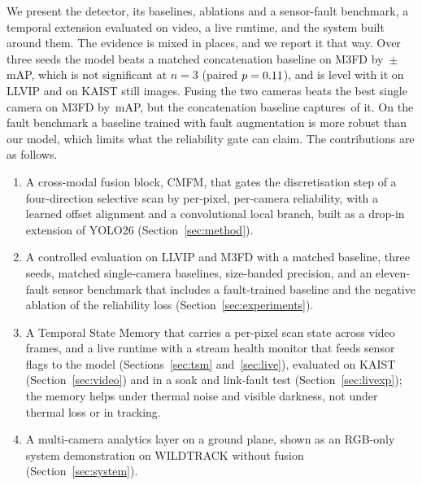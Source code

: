 We present the detector, its baselines, ablations and a sensor-fault benchmark, a temporal extension evaluated on video, a live runtime, and the system built around them. The evidence is mixed in places, and we report it that way. Over three seeds the model beats a matched concatenation baseline on M3FD by \marMfdVtwoVsConcatMdMeanMap{}\,$\pm$\,\marMfdVtwoVsConcatMdStdMap{} mAP, which is not significant at $n=3$ (paired $p=0.11{}$), and is level with it on LLVIP and on KAIST still images. Fusing the two cameras beats the best single camera on M3FD by \gainMfdCffmVtwoOverBestMeanMap{}\,mAP, but the concatenation baseline captures \gainMfdConcatMdOverBestMeanMap{}\,of it. On the fault benchmark a baseline trained with fault augmentation is more robust than our model, which limits what the reliability gate can claim. The contributions are as follows.
\begin{enumerate}
\item A cross-modal fusion block, CMFM, that gates the discretisation step of a four-direction selective scan by per-pixel, per-camera reliability, with a learned offset alignment and a convolutional local branch, built as a drop-in extension of YOLO26 (Section~\ref{sec:method}).
\item A controlled evaluation on LLVIP and M3FD with a matched baseline, three seeds, matched single-camera baselines, size-banded precision, and an eleven-fault sensor benchmark that includes a fault-trained baseline and the negative ablation of the reliability loss (Section~\ref{sec:experiments}).
\item A Temporal State Memory that carries a per-pixel scan state across video frames, and a live runtime with a stream health monitor that feeds sensor flags to the model (Sections~\ref{sec:tsm} and~\ref{sec:live}), evaluated on KAIST (Section~\ref{sec:video}) and in a soak and link-fault test (Section~\ref{sec:livexp}); the memory helps under thermal noise and visible darkness, not under thermal loss or in tracking.
\item A multi-camera analytics layer on a ground plane, shown as an RGB-only system demonstration on WILDTRACK without fusion (Section~\ref{sec:system}).
\end{enumerate}

